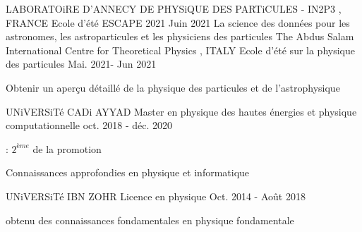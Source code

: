 

\begin{cventries}
	\cventry
	{LABORATOiRE D'ANNECY DE PHYSiQUE DES PARTiCULES - IN2P3 , FRANCE
	} %
	{Ecole d'été ESCAPE 2021 } %
	{} %
	{ Juin 2021} %
	{La science des données pour les astronomes, les astroparticules et les physiciens des particules}
	\cventry
	{The Abdus Salam International Centre for Theoretical Physics , ITALY} %
	{Ecole d'été sur la physique des particules} %
	{} %
	{Mai. 2021- Jun 2021} %
	{\begin{cvitems}
			\item Obtenir un aperçu détaillé de la physique des particules et de l'astrophysique 
		\end{cvitems}
	}
	\cventry
	{UNiVERSiTé CADi AYYAD
	} %
	{Master en physique des hautes énergies et physique computationnelle
	} %
	{} %
	{oct. 2018 - déc. 2020} %
	{
		\begin{cvitems} %
			\item {:  $2^{ème}$ de la promotion}
			\item {Connaissances approfondies en physique et informatique}
		\end{cvitems}
	}
	\cventry
	{UNiVERSiTé IBN ZOHR} %
	{Licence en physique} %
	{} %
	{Oct. 2014 - Août 2018} %
	{
		\begin{cvitems} %
			\item {obtenu des connaissances fondamentales en physique fondamentale}
		\end{cvitems}
	}
\end{cventries}
